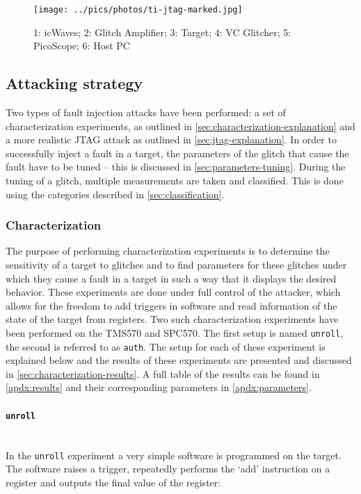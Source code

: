 \documentclass[10pt]{article}
\newcommand{\TI}{TMS570\xspace}
\newcommand{\ST}{SPC570\xspace}
\newcommand{\unroll}{\texttt{unroll}\xspace}
\newcommand{\auth}{\texttt{auth}\xspace}
\begin{document}
    \begin{figure}[H]
      \centering
      \texttt{[image: ../pics/photos/ti-jtag-marked.jpg]}
      \caption{1: icWaves; 2: Glitch Amplifier; 3: Target; 4: VC Glitcher; 5: PicoScope; 6: Host PC}
      \label{fig:ti-jtag-marked}
    \end{figure}

  \subsection{Attacking strategy } 
  \label{sec:attackstrategy}

    Two types of fault injection attacks have been performed: a set of characterization experiments, as outlined in \autoref{sec:characterization-explanation} and a more realistic JTAG attack as outlined in \autoref{sec:jtag-explanation}. In order to successfully inject a fault in a target, the parameters of the glitch that cause the fault have to be tuned -- this is discussed in \autoref{sec:parameters-tuning}. During the tuning of a glitch, multiple measurements are taken and classified. This is done using the categories described in \autoref{sec:classification}.

    \subsubsection{Characterization }
    \label{sec:characterization-explanation}

      The purpose of performing characterization experiments is to determine the sensitivity of a target to glitches and to find parameters for these glitches under which they cause a fault in a target in such a way that it displays the desired behavior. These experiments are done under full control of the attacker, which allows for the freedom to add triggers in software and read information of the state of the target from registers.
      Two such characterization experiments have been performed on the \TI and \ST. The first setup is named \unroll, the second is referred to as \auth. The setup for each of these experiment is explained below and the results of these experiments are presented and discussed in \autoref{sec:characterization-results}. A full table of the results can be found in \autoref{apdx:results} and their corresponding parameters in \autoref{apdx:parameters}. 
        \paragraph*{\unroll}  \ \\ \noindent
          In the \unroll experiment a very simple software is programmed on the target. The software raises a trigger, repeatedly performs the `add' instruction on a register and outputs the final value of the register:
\end{document}
